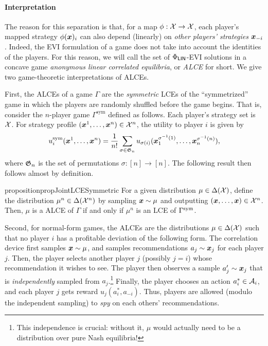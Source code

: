 \paragraph{Interpretation} The reason for this separation is that, for a map $\phi : {\mathcal{X}} \to {\mathcal{X}}$, each player's mapped strategy $\phi({\bm{x}})_i$ can also depend (linearly) on {\em other players' strategies} ${\bm{x}}_{-i}$. Indeed, the EVI formulation of a game does not take into account the identities of the players. For this reason, we will call the set of $\Phi_\mathsf{LIN}$-EVI solutions in a concave game {\em anonymous linear correlated equilibria}, or {\em ALCE} for short. We give two game-theoretic interpretations of ALCEs.

First, the ALCEs of a game $\Gamma$ are the {\em symmetric} LCEs of the ``symmetrized'' game in which the players are randomly shuffled before the game begins. That is, consider the $n$-player game $\Gamma^\text{sym}$ defined as follows. Each player's strategy set is ${\mathcal{X}}$. For strategy profile $({\bm{x}}^1, \dots, {\bm{x}}^n) \in {\mathcal{X}}^n$, the utility to player $i$ is given by 
\begin{equation*}
    u_i^\text{sym}({\bm{x}}^1, \dots, {\bm{x}}^n) = \frac{1}{n!} \sum_{\sigma \in \mathfrak{G}_n } u_{\sigma(i)}({\bm{x}}^{\sigma^{-1}(1)}_1, \dots, {\bm{x}}^{\sigma^{-1}(n)}_n),
\end{equation*}
where $\mathfrak{G}_n$ is the set of permutations $\sigma : [n] \to [n]$. The following result then follows almost by definition.
\begin{restatable}{proposition}{propJointLCESymmetric}\label{prop:joint lce symmetric}
    For a given distribution $\mu \in \Delta({\mathcal{X}})$, define the distribution $\mu^n \in \Delta({\mathcal{X}}^n)$ by sampling ${\bm{x}}\sim\mu$ and outputting $({\bm{x}}, \dots, {\bm{x}}) \in {\mathcal{X}}^n$. Then, $\mu$ is a ALCE of $\Gamma$ if and only if $\mu^n$ is an LCE of $\Gamma^\textup{sym}$. 
\end{restatable}

Second, for normal-form games, the ALCEs are the distributions $\mu \in \Delta({\mathcal{X}})$ such that no player $i$ has a profitable deviation of the following form. The correlation device first samples ${\bm{x}}\sim\mu$, and samples recommendations $a_j \sim {\bm{x}}_j$ for each player $j$. Then, the player selects another player $j$ (possibly $j=i$) whose recommendation it wishes to see. The player then observes a sample $a_j' \sim {\bm{x}}_j$ that is {\em independently} sampled from $a_j$.\footnote{This independence is crucial: without it, $\mu$ would actually need to be a distribution over pure Nash equilibria!} Finally, the player chooses an action $a_i^* \in {\mathcal{A}}_i$, and each player $j$ gets reward $u_j(a_i^*, a_{-i})$. Thus, players are allowed (modulo the independent sampling) to {\em spy} on each others' recommendations.

